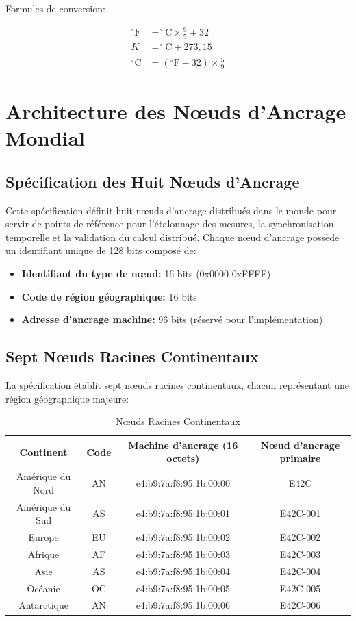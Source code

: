 \documentclass[12pt]{book}
\begin{document}
Formules de conversion:

\begin{align}
^{\circ}\text{F} &= ^{\circ}\text{C} \times \frac{9}{5} + 32 \\
K &= ^{\circ}\text{C} + 273,15 \\
^{\circ}\text{C} &= (^{\circ}\text{F} - 32) \times \frac{5}{9}
\end{align}

\chapter{Architecture des Nœuds d'Ancrage Mondial}

\section{Spécification des Huit Nœuds d'Ancrage}

Cette spécification définit huit nœuds d'ancrage distribués dans le monde pour servir de points de référence pour l'étalonnage des mesures, la synchronisation temporelle et la validation du calcul distribué. Chaque nœud d'ancrage possède un identifiant unique de 128 bits composé de:

\begin{itemize}
\item \textbf{Identifiant du type de nœud:} 16 bits (0x0000-0xFFFF)
\item \textbf{Code de région géographique:} 16 bits
\item \textbf{Adresse d'ancrage machine:} 96 bits (réservé pour l'implémentation)
\end{itemize}

\section{Sept Nœuds Racines Continentaux}

La spécification établit sept nœuds racines continentaux, chacun représentant une région géographique majeure:

\begin{table}[h]
\centering
\begin{tabular}{|c|c|c|c|}
\hline
Continent & Code & Machine d'ancrage (16 octets) & Nœud d'ancrage primaire \\
\hline
Amérique du Nord & AN & e4:b9:7a:f8:95:1b:00:00 & E42C \\
\hline
Amérique du Sud & AS & e4:b9:7a:f8:95:1b:00:01 & E42C-001 \\
\hline
Europe & EU & e4:b9:7a:f8:95:1b:00:02 & E42C-002 \\
\hline
Afrique & AF & e4:b9:7a:f8:95:1b:00:03 & E42C-003 \\
\hline
Asie & AS & e4:b9:7a:f8:95:1b:00:04 & E42C-004 \\
\hline
Océanie & OC & e4:b9:7a:f8:95:1b:00:05 & E42C-005 \\
\hline
Antarctique & AN & e4:b9:7a:f8:95:1b:00:06 & E42C-006 \\
\hline
\end{tabular}
\caption{Nœuds Racines Continentaux}
\end{table}
\end{document}
